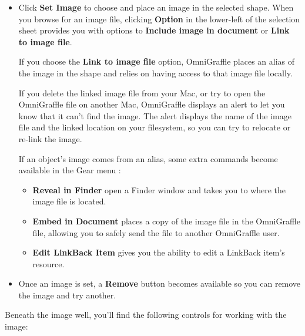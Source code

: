 \documentclass[../main.tex]{subfiles}
\begin{document}
\begin{itemize}
  \item Click \textbf{Set Image} to choose and place an image in the selected shape. When you
    browse for an image file, clicking \textbf{Option} in the lower-left of the selection sheet
    provides you with options to \textbf{Include image in document} or \textbf{Link to image
    file}.


    If you choose the \textbf{Link to image file} option, OmniGraffle places an alias of the image
    in the shape and relies on having access to that image file locally.

    \begin{ogtip}
      If you delete the linked image file from your Mac, or try to open the OmniGraffle file on
      another Mac, OmniGraffle displays an alert to let you know that it can't find the image. The
      alert displays the name of the image file and the linked location on your filesystem, so you
      can try to relocate or re-link the image.
    \end{ogtip}

    If an object's image comes from an alias, some extra commands become available in the Gear
    menu :

    \begin{itemize}
      \item \textbf{Reveal in Finder} open a Finder window and takes you to where the image file
        is located.
      \item \textbf{Embed in Document} places a copy of the image file in the OmniGraffle file,
        allowing you to safely send the file to another OmniGraffle user.
      \item \textbf{Edit LinkBack Item} gives you the ability to edit a LinkBack item's resource.
    \end{itemize}
  \item Once an image is set, a \textbf{Remove} button becomes available so you can remove the
    image and try another.
\end{itemize}

Beneath the image well, you'll find the following controls for working with the image:
\end{document}
